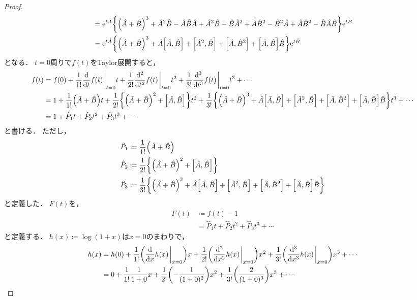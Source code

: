 \documentclass{report}
\begin{document}
\begin{proof}
\begin{align}
        &= \mathrm{e}^{t\hat{A}}\qty{\qty(\hat{A} + \hat{B})^3 + \hat{A}^2\hat{B} - \hat{A}\hat{B}\hat{A} + \hat{A}^2\hat{B} - \hat{B}\hat{A}^2 + \hat{A}\hat{B}^2 - \hat{B}^2\hat{A} + \hat{A}\hat{B}^2 - \hat{B}\hat{A}\hat{B}}\mathrm{e}^{t\hat{B}} \\ 
        &= \mathrm{e}^{t\hat{A}}\qty{\qty(\hat{A} + \hat{B})^3 + \hat{A}\qty[\hat{A}, \hat{B}] + \qty[\hat{A}^2, \hat{B}] + \qty[\hat{A}, \hat{B}^2] + \qty[\hat{A}, \hat{B}]\hat{B}}\mathrm{e}^{t\hat{B}} 
      \end{align}
      となる．
      $t = 0$周りで$f(t)$をTaylor展開すると，
      \begin{align}
        f(t) &= f(0) + \frac{1}{1!}\dv{t}f(t)\eval_{t = 0}t + \frac{1}{2!}\dv[2]{t}f(t)\eval_{t = 0}t^2 + \frac{1}{3!}\dv[3]{t}f(t)\eval_{t = 0}t^3 + \cdots \\ 
        &= 1 + \frac{1}{1!}\qty(\hat{A} + \hat{B})t + \frac{1}{2!}\qty{\qty(\hat{A} + \hat{B})^2 + \qty[\hat{A}, \hat{B}]}t^2 + \frac{1}{3!}\qty{\qty(\hat{A} + \hat{B})^3 + \hat{A}\qty[\hat{A}, \hat{B}] + \qty[\hat{A}^2, \hat{B}] + \qty[\hat{A}, \hat{B}^2] + \qty[\hat{A}, \hat{B}]\hat{B}}t^3 + \cdots \\ 
        &= 1 + \hat{P}_1t + \hat{P}_2t^2 + \hat{P}_3t^3 + \cdots \\ 
      \end{align}
      と書ける．
      ただし，
      \begin{align}
        \hat{P}_1 &\coloneqq \frac{1}{1!}\qty(\hat{A} + \hat{B}) \\ 
        \hat{P}_2 &\coloneqq \frac{1}{2!}\qty{\qty(\hat{A} + \hat{B})^2 + \qty[\hat{A}, \hat{B}]} \\ 
        \hat{P}_3 &\coloneqq \frac{1}{3!}\qty{\qty(\hat{A} + \hat{B})^3 + \hat{A}\qty[\hat{A}, \hat{B}] + \qty[\hat{A}^2, \hat{B}] + \qty[\hat{A}, \hat{B}^2] + \qty[\hat{A}, \hat{B}]\hat{B}}
      \end{align}
      と定義した．
      $F(t)$を，
      \begin{align}
        F(t) &\coloneqq f(t) - 1 \\ 
        &= \hat{P}_1t + \hat{P}_2t^2 + \hat{P}_3t^3 + \cdots
      \end{align}
      と定義する．
      $h(x) \coloneqq \log (1 + x)$は$x = 0$のまわりで，
      \begin{align}
        h(x) &= h(0) + \frac{1}{1!}\qty(\dv{x}h(x)\eval_{x = 0})x + \frac{1}{2!}\qty(\dv[2]{x}h(x)\eval_{x = 0})x^2 + \frac{1}{3!}\qty(\dv[3]{x}h(x)\eval_{x = 0})x^3 + \cdots \\ 
        &= 0 + \frac{1}{1!}\frac{1}{1 + 0}x + \frac{1}{2!}\qty(-\frac{1}{(1 + 0)^2})x^2 + \frac{1}{3!}\qty(\frac{2}{(1 + 0)^3})x^3 + \cdots \\ 

\end{align}
\end{proof}
\end{document}

